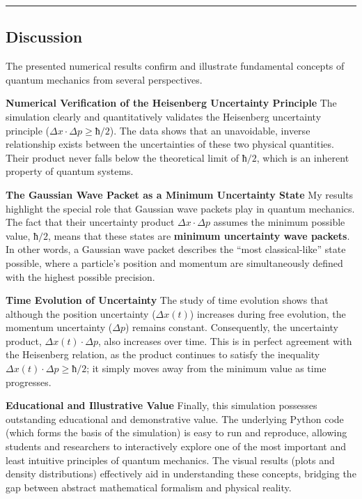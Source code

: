 \begin{center}\rule{0.5\linewidth}{0.5pt}\end{center}

\subsection{Discussion}\label{discussion}

The presented numerical results confirm and illustrate fundamental
concepts of quantum mechanics from several perspectives.

\textbf{Numerical Verification of the Heisenberg Uncertainty Principle}
The simulation clearly and quantitatively validates the Heisenberg
uncertainty principle (\(Δx·Δp ≥ ħ/2\)). The data shows that an
unavoidable, inverse relationship exists between the uncertainties of
these two physical quantities. Their product never falls below the
theoretical limit of \(ħ/2\), which is an inherent property of quantum
systems.

\textbf{The Gaussian Wave Packet as a Minimum Uncertainty State} My
results highlight the special role that Gaussian wave packets play in
quantum mechanics. The fact that their uncertainty product \(Δx·Δp\)
assumes the minimum possible value, \(ħ/2\), means that these states are
\textbf{minimum uncertainty wave packets}. In other words, a Gaussian
wave packet describes the ``most classical-like'' state possible, where
a particle's position and momentum are simultaneously defined with the
highest possible precision.

\textbf{Time Evolution of Uncertainty} The study of time evolution shows
that although the position uncertainty (\(Δx(t)\)) increases during free
evolution, the momentum uncertainty (\(Δp\)) remains constant.
Consequently, the uncertainty product, \(Δx(t)·Δp\), also increases over
time. This is in perfect agreement with the Heisenberg relation, as the
product continues to satisfy the inequality \(Δx(t)·Δp ≥ ħ/2\); it
simply moves away from the minimum value as time progresses.

\textbf{Educational and Illustrative Value} Finally, this simulation
possesses outstanding educational and demonstrative value. The
underlying Python code (which forms the basis of the simulation) is easy
to run and reproduce, allowing students and researchers to interactively
explore one of the most important and least intuitive principles of
quantum mechanics. The visual results (plots and density distributions)
effectively aid in understanding these concepts, bridging the gap
between abstract mathematical formalism and physical reality.

